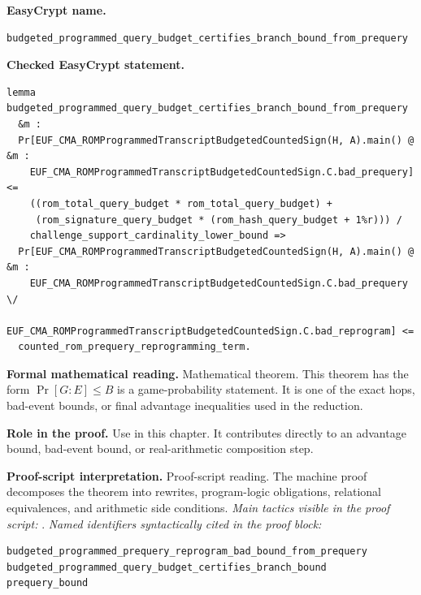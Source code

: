 \begin{formaltheorem}
\noindent\textbf{EasyCrypt name.}
\begin{lstlisting}[language=EasyCrypt,basicstyle=\ttfamily\scriptsize]
budgeted_programmed_query_budget_certifies_branch_bound_from_prequery
\end{lstlisting}
\noindent\textbf{Checked EasyCrypt statement.}
\begin{lstlisting}[language=EasyCrypt,basicstyle=\ttfamily\scriptsize]
lemma budgeted_programmed_query_budget_certifies_branch_bound_from_prequery
  &m :
  Pr[EUF_CMA_ROMProgrammedTranscriptBudgetedCountedSign(H, A).main() @ &m :
    EUF_CMA_ROMProgrammedTranscriptBudgetedCountedSign.C.bad_prequery] <=
    ((rom_total_query_budget * rom_total_query_budget) +
     (rom_signature_query_budget * (rom_hash_query_budget + 1%r))) /
    challenge_support_cardinality_lower_bound =>
  Pr[EUF_CMA_ROMProgrammedTranscriptBudgetedCountedSign(H, A).main() @ &m :
    EUF_CMA_ROMProgrammedTranscriptBudgetedCountedSign.C.bad_prequery \/
    EUF_CMA_ROMProgrammedTranscriptBudgetedCountedSign.C.bad_reprogram] <=
  counted_rom_prequery_reprogramming_term.
\end{lstlisting}
\noindent\textbf{Formal mathematical reading.}
Mathematical theorem. This theorem has the form \(\Pr[G:E] \le B\) is a game-probability statement.  It is one of the exact hops, bad-event bounds, or final advantage inequalities used in the reduction.

\noindent\textbf{Role in the proof.}
Use in this chapter. It contributes directly to an advantage bound, bad-event bound, or real-arithmetic composition step.

\noindent\textbf{Proof-script interpretation.}
Proof-script reading. The machine proof decomposes the theorem into rewrites, program-logic obligations, relational equivalences, and arithmetic side conditions.
\emph{Main tactics visible in the proof script:} .
\emph{Named identifiers syntactically cited in the proof block:}
\begin{lstlisting}[language=EasyCrypt,basicstyle=\ttfamily\scriptsize]
budgeted_programmed_prequery_reprogram_bad_bound_from_prequery
budgeted_programmed_query_budget_certifies_branch_bound
prequery_bound
\end{lstlisting}

\end{formaltheorem}

